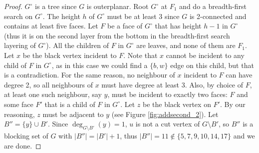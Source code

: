 \documentclass{patmorin}
\newcommand{\wdual}[1]{#1^{\circ}}
\begin{document}
\begin{proof}
 $\wdual{G}$ is a tree since $G$ is outerplanar. Root $\wdual{G}$ at $F_1$ and do a breadth-first search on $\wdual{G}$. The height $h$ of $\wdual{G}$ must be at least 3 since $G$ is 2-connected and contains at least five faces. Let $F$ be a face of $\wdual{G}$ that has height $h-1$ in $\wdual{G}$ (thus it is on the second layer from the bottom in the breadth-first search layering of $\wdual{G}$). All the children of $F$ in $\wdual{G}$ are leaves, and none of them are $F_1$. Let $x$ be the black vertex incident to $F$. Note that $x$ cannot be incident to any child of $F$ in $\wdual{G}$, as in this case we could find a $\{b,w\}$ edge on this child, but that is a contradiction. For the same reason, no neighbour of $x$ incident to $F$ can have degree 2, so all neighbours of $x$ must have degree at least 3. Also, by choice of $F$, at least one such neighbour, say $y$, must be incident to exactly two faces: $F$ and some face $F'$ that is a child of $F$ in $\wdual{G}$. Let $z$ be the black vertex on $F'$. By our reasoning, $z$ must be adjacent to $y$ (see Figure \ref{fig:addsecond_2}). Let $B''=\{y\} \cup B'$. Since $\deg_{G \setminus B'}(y)=1$, $u$ is not a cut vertex of $G \setminus B'$, so $B''$ is a blocking set of $G$ with $|B''|=|B'|+1$, thus $|B''|=11 \notin \{5, 7, 9, 10, 14, 17\}$ and we are done. 
\end{proof}
 
\end{document}
